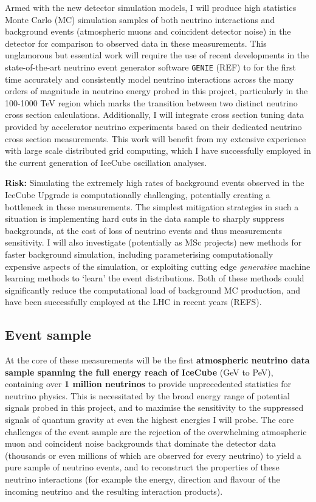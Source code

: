 \documentclass[a4paper,11pt]{article}
\begin{document}
Armed with the new detector simulation models, I will produce high statistics Monte Carlo (MC) simulation samples of both neutrino interactions and background events (atmospheric muons and coincident detector noise) in the detector for comparison to observed data in these measurements. This unglamorous but essential work will require the use of recent developments in the state-of-the-art neutrino event generator software \texttt{GENIE} (REF) to for the first time accurately and consistently model neutrino interactions across the many orders of magnitude in neutrino energy probed in this project, particularly in the 100-1000 TeV region which marks the transition between two distinct neutrino cross section calculations. Additionally, I will integrate cross section tuning data provided by accelerator neutrino experiments based on their dedicated neutrino cross section measurements. This work will benefit from my extensive experience with large scale distributed grid computing, which I have successfully employed in the current generation of IceCube oscillation analyses.

\textbf{Risk:} Simulating the extremely high rates of background events observed in the IceCube Upgrade is computationally challenging, potentially creating a bottleneck in these measurements. The simplest mitigation strategies in such a situation is implementing hard cuts in the data sample to sharply suppress backgrounds, at the cost of loss of neutrino events and thus measurements sensitivity. I will also investigate (potentially as MSc projects) new methods for faster background simulation, including parameterising computationally expensive aspects of the simulation, or exploiting cutting edge \textit{generative} machine learning methods to `learn' the event distributions. Both of these methods could significantly reduce the computational load of background MC production, and have been successfully employed at the LHC in recent years (REFS). \\


\subsection{Event sample}

At the core of these measurements will be the first \textbf{atmospheric neutrino data sample spanning the full energy reach of IceCube} (GeV to PeV), containing over \textbf{1 million neutrinos} to provide unprecedented statistics for neutrino physics. This is necessitated by the broad energy range of potential signals probed in this project, and to maximise the sensitivity to the suppressed signals of quantum gravity at even the highest energies I will probe. The core challenges of the event sample are the rejection of the overwhelming atmospheric muon and coincident noise backgrounds that dominate the detector data (thousands or even millions of which are observed for every neutrino) to yield a pure sample of neutrino events, and to reconstruct the properties of these neutrino interactions (for example the energy, direction and flavour of the incoming neutrino and the resulting interaction products).
\end{document}
